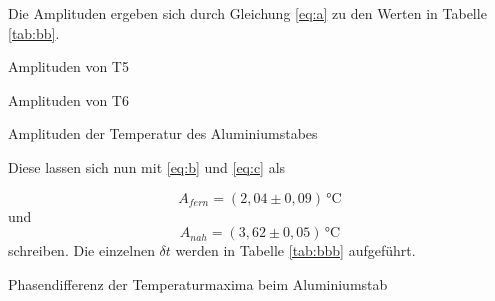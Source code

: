 \noindent Die Amplituden ergeben sich durch Gleichung \ref{eq:a} zu den Werten in Tabelle \ref{tab:bb}.
 
 
 \begin{table}[H]
  \centering
    \begin{subtable}{.42\linewidth}
      \centering
            \caption{Amplituden von T5}

    \end{subtable}
    \begin{subtable}{.42\linewidth}
      \centering
           \caption{Amplituden von T6}

    \end{subtable} 
        \caption{Amplituden der Temperatur des Aluminiumstabes}
    \label{tab:bb}
\end{table}

\noindent Diese lassen sich nun mit \ref{eq:b} und \ref{eq:c} als 

\begin{equation*}
  A_{fern}=(2,04 \pm 0,09)\,\si{\celsius} 
\end{equation*}
\noindent und
\begin{equation*}
  A_{nah}=(3,62 \pm 0,05)\,\si{\celsius} 
\end{equation*}
\noindent schreiben. Die einzelnen $\delta t$ werden in Tabelle \ref{tab:bbb} aufgeführt.


\begin{table}[H]
      \centering

        \caption{Phasendifferenz der Temperaturmaxima beim Aluminiumstab}
    \label{tab:bbb}
\end{table}


